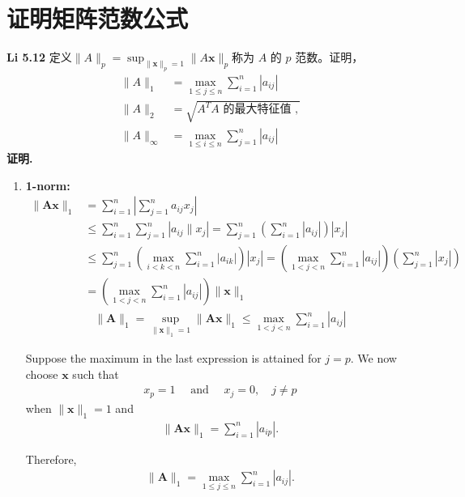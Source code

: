 \documentclass[11pt]{article}
\begin{document}
\section{证明矩阵范数公式}
\textbf{Li 5.12 }定义$\|A\|_{p}=\sup _{\|\boldsymbol{x}\|_{p}=1}\|A \boldsymbol{x}\|_p$称为 $A$ 的 $p$ 范数。证明，
\begin{align*}
    \|A\|_{1}&=\max _{1 \leq j \leq n} \sum_{i=1}^{n}\left|a_{i j}\right|\\
    \|A\|_{2}&=\sqrt{A^{T} A \text { 的最大特征值 },}\\
    \|A\|_{\infty}&=\max _{1 \leq i \leq n} \sum_{j=1}^{n}\left|a_{i j}\right|  
\end{align*}
\textbf{证明.}
\begin{enumerate}
    \item\textbf{1-norm: } 
    \begin{align*}
        \|\mathbf{A} \mathbf{x}\|_{1} &=\sum_{i=1}^{n}\left|\sum_{j=1}^{n} a_{i j} x_{j}\right| \\
        & \leq \sum_{i=1}^{n} \sum_{j=1}^{n}\left|a_{i j} \| x_{j}\right|=\sum_{j=1}^{n}\left(\sum_{i=1}^{n}\left|a_{i j}\right|\right)\left|x_{j}\right| \\
        & \leq \sum_{j=1}^{n}\left(\max _{i<k<n} \sum_{i=1}^{n}\left|a_{i k}\right|\right)\left|x_{j}\right|
        =\left(\max _{1<j<n} \sum_{i=1}^{n}\left|a_{i j}\right|\right)\left(\sum_{j=1}^{n}\left|x_{j}\right|\right)\\ 
        &=\left(\max _{1<j<n} \sum_{i=1}^{n}\left|a_{i j}\right|\right)\|\mathbf{x}\|_{1}
    \end{align*}
    \begin{align*}
        \|\mathbf{A}\|_{1}=\sup_{\|\mathbf{x}\|_{1}=1}\|\mathbf{A} \mathbf{x}\|_{1} \leq \max _{1<j<n} \sum_{i=1}^{n}\left|a_{i j}\right|
    \end{align*}
    \par Suppose the maximum in the last expression is attained for $j=p$. We now choose $\mathbf{x}$ such that
    \begin{align*}
        x_{p}=1 \quad \text { and } \quad x_{j}=0, \quad j \neq p
    \end{align*}
    when $\|\mathbf{x}\|_{1}=1$ and
    \begin{align*}
        \|\mathbf{A} \mathbf{x}\|_{1}=\sum_{i=1}^{n}\left|a_{i p}\right|.
    \end{align*}
    \par Therefore,
    \begin{align*}
        \|\mathbf{A}\|_{1}=\max _{1\leq j\leq n} \sum_{i=1}^{n}\left|a_{i j}\right|.

\end{align*}
\end{enumerate}
\end{document}
